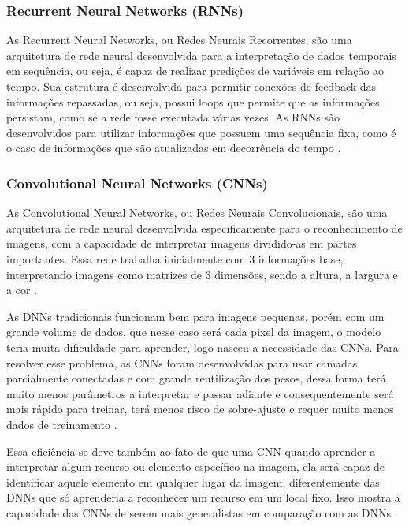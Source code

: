 \subsubsection{Recurrent Neural Networks (RNNs)}
\label{sec:rnn}
As Recurrent Neural Networks, ou Redes Neurais Recorrentes, são uma arquitetura de rede neural desenvolvida para a interpretação de dados temporais em sequência, ou seja, é capaz de realizar predições de variáveis em relação ao tempo. Sua estrutura é desenvolvida para permitir conexões de feedback das informações repassadas, ou seja, possui loops que permite que as informações persistam, como se a rede fosse executada várias vezes. As RNNs são desenvolvidos para utilizar informações que possuem uma sequência fixa, como é o caso de informações que são atualizadas em decorrência do tempo \cite{deepLearningTensorFlow}.

\subsubsection{Convolutional Neural Networks (CNNs)}
\label{sec:cnn}
As Convolutional Neural Networks, ou Redes Neurais Convolucionais, são uma arquitetura de rede neural desenvolvida especificamente para o reconhecimento de imagens, com a capacidade de interpretar imagens dividido-as em partes importantes. Essa rede trabalha inicialmente com 3 informações base, interpretando imagens como matrizes de 3 dimensões, sendo a altura, a largura e a cor \cite{deepLearningTensorFlow}.

As DNNs tradicionais funcionam bem para imagens pequenas, porém com um grande volume de dados, que nesse caso será cada pixel da imagem, o modelo teria muita dificuldade para aprender, logo nasceu a necessidade das CNNs. Para resolver esse problema, as CNNs foram desenvolvidas para usar camadas parcialmente conectadas e com grande reutilização dos pesos, dessa forma terá muito menos parâmetros a interpretar e passar adiante e consequentemente será mais rápido para treinar, terá menos risco de sobre-ajuste e requer muito menos dados de treinamento \cite{deepLearningTensorFlow}.

Essa eficiência se deve também ao fato de que uma CNN quando aprender a interpretar algum recurso ou elemento específico na imagem, ela será capaz de identificar aquele elemento em qualquer lugar da imagem, diferentemente das DNNs que só aprenderia a reconhecer um recurso em um local fixo. Isso mostra a capacidade das CNNs de serem mais generalistas em comparação com as DNNs \cite{deepLearningTensorFlow}.

